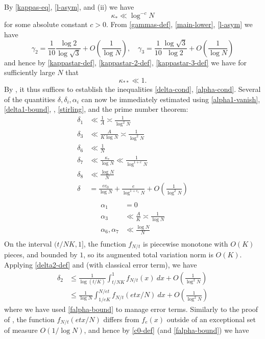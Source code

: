 \documentclass[12pt,a4paper,reqno]{amsart}
\numberwithin{equation}{section}
\theoremstyle{plain}
\theoremstyle{definition}
\begin{document}
By \eqref{kappas-eq}, \eqref{l-asym}, and (ii) we have
$$ \kappa_* \ll \log^{-c} N$$
for some absolute constant $c>0$.  From \eqref{gammas-def}, \eqref{main-lower}, \eqref{l-asym} we have
$$ \gamma_2 = \frac{1}{10} \frac{\log 2}{\log \sqrt{3}} + O\left(\frac{1}{\log N}\right), \quad
 \gamma_3 = \frac{1}{10} \frac{\log \sqrt{3}}{\log 2} + O\left(\frac{1}{\log N}\right)
$$
and hence by \eqref{kappastar-def},  \eqref{kappastar-2-def}, \eqref{kappastar-3-def} we have for sufficiently large $N$ that
$$ \kappa_{**} \ll 1.$$
By , it thus suffices to establish the inequalities \eqref{delta-cond}, \eqref{alpha-cond}.
Several of the quantities $\delta, \delta_i, \alpha_i$ can now be immediately estimated using \eqref{alpha1-vanish}, \eqref{delta1-bound}, , \eqref{stirling}, and the prime number theorem:
\begin{align*}
  \delta_1 &\ll \frac{1}{A} \asymp \frac{1}{\log^2 N} \\
  \delta_3 &\ll \frac{A}{K \log N} \asymp \frac{1}{\log^2 N} \\
  \delta_6 &\ll \frac{1}{N} \\
  \delta_7 &\ll \frac{\kappa_*}{\log N} \ll \frac{1}{\log^{1+c} N} \\
  \delta_8 &\ll \frac{\log N}{N} \\
  \delta &= \frac{ec_0}{\log N} + \frac{e}{\log^{1+c_1} N} + O\left( \frac{1}{\log^2 N} \right)\\  
\end{align*}
\begin{align*}
  \alpha_1 &= 0 \\
  \alpha_3 &\ll \frac{A}{K} \asymp \frac{1}{\log N} \\
  \alpha_6, \alpha_7 &\ll \frac{\log N}{N} \\
\end{align*}
On the interval $(t/NK,1]$, the function $f_{N/t}$ is piecewise monotone with $O(K)$ pieces, and bounded by $1$, so its augmented total variation norm is $O(K)$.  Applying \eqref{delta2-def} and  (with classical error term), we have
\begin{align*}
\delta_2 &\leq \frac{1}{\log(t/K)} \int_{t/NK}^1 f_{N/t}(x)\ dx + O\left( \frac{1}{\log^2 N} \right) \\
&\leq \frac{1}{\log N} \int_{1/eK}^{N/et} f_{N/t}(etx/N)\ dx + O\left( \frac{1}{\log^2 N} \right)
\end{align*}
where we have used \eqref{falpha-bound} to manage error terms.
Similarly to the proof of , the function $f_{N/t}(etx/N)$ differs from $f_e(x)$ outside of an exceptional set of measure $O(1/\log N)$, and hence by \eqref{c0-def} (and \eqref{falpha-bound}) we have
\end{document}
